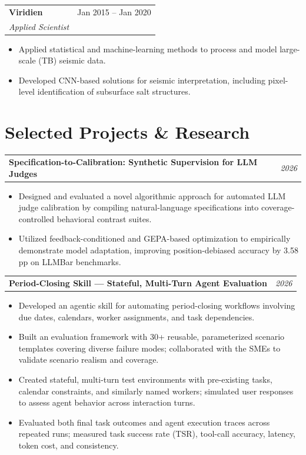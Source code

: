 \documentclass[10pt,letterpaper]{article}
\makeatletter
\newcommand{\heading}[2]{\vspace{2pt}\begin{tabularx}{\textwidth}{@{}Xr@{}}\textbf{#1} & \textit{#2}\end{tabularx}\vspace{-0pt}}
\newcommand{\headingwtitle}[3]{\vspace{2pt}\begin{tabularx}{\textwidth}{@{}Xr@{}}\textbf{#1} & #3\\[1pt] \textit{#2} & \end{tabularx}\vspace{-0pt}}
\makeatother
\begin{document}
\headingwtitle{Viridien}{Applied Scientist}{Jan 2015 -- Jan 2020}
\begin{itemize}
\item Applied statistical and machine-learning methods to process and model large-scale (TB) seismic data.
\item Developed CNN-based solutions for seismic interpretation, including pixel-level identification of subsurface salt structures.
\end{itemize}

\section*{Selected Projects \& Research}

\heading{Specification-to-Calibration: Synthetic Supervision for LLM Judges}{2026}
\begin{itemize}
\item Designed and evaluated a novel algorithmic approach for automated LLM judge calibration by compiling natural-language specifications into coverage-controlled behavioral contrast suites.
\item Utilized feedback-conditioned and GEPA-based optimization to empirically demonstrate model adaptation, improving position-debiased accuracy by 3.58 pp on LLMBar benchmarks.
\end{itemize}

\heading{Period-Closing Skill --- Stateful, Multi-Turn Agent Evaluation}{2026}
\begin{itemize}
\item Developed an agentic skill for automating period-closing workflows involving due dates, calendars, worker assignments, and task dependencies.
\item Built an evaluation framework with 30+ reusable, parameterized scenario templates covering diverse failure modes; collaborated with the SMEs to validate scenario realism and coverage.
\item Created stateful, multi-turn test environments with pre-existing tasks, calendar constraints, and similarly named workers; simulated user responses to assess agent behavior across interaction turns.
\item Evaluated both final task outcomes and agent execution traces across repeated runs; measured task success rate (TSR), tool-call accuracy, latency, token cost, and consistency.
\end{itemize}
\end{document}
